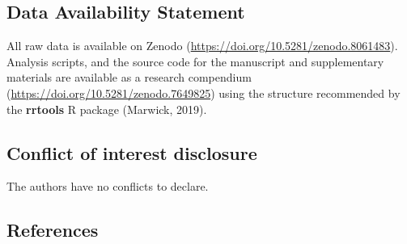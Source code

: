 \documentclass[
]{article}
\begin{document}
\hypertarget{data-availability-statement}{%
\subsection*{Data Availability
Statement}\label{data-availability-statement}}

All raw data is available on Zenodo
(\url{https://doi.org/10.5281/zenodo.8061483}). Analysis scripts, and
the source code for the manuscript and supplementary materials are
available as a research compendium
(\url{https://doi.org/10.5281/zenodo.7649825}) using the structure
recommended by the \textbf{rrtools} R package (Marwick, 2019).

\hypertarget{conflict-of-interest-disclosure}{%
\subsection*{Conflict of interest
disclosure}\label{conflict-of-interest-disclosure}}

The authors have no conflicts to declare.

\hypertarget{references}{%
\subsection*{References}\label{references}}
\end{document}
